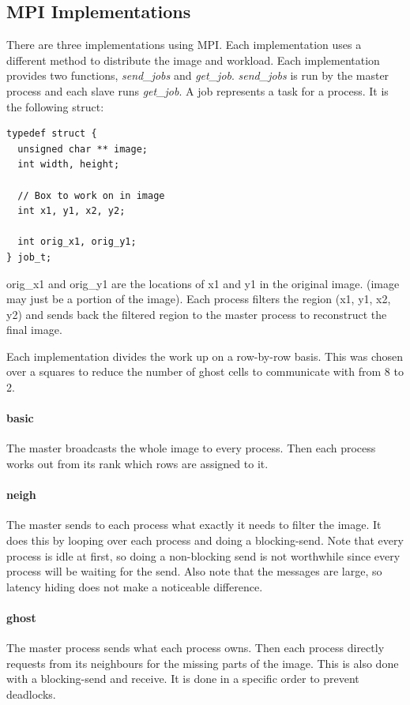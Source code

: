 \documentclass{article}
\begin{document}
\subsection{MPI Implementations}

There are three implementations using MPI. Each implementation uses a
different method to distribute the image and workload. Each implementation
provides two functions, \emph{send\_jobs} and
\emph{get\_job}. \emph{send\_jobs} is run by the master process and each slave
runs \emph{get\_job}. A job represents a task for a process. It is the
following struct:
\begin{verbatim}
typedef struct {
  unsigned char ** image;
  int width, height;

  // Box to work on in image
  int x1, y1, x2, y2;

  int orig_x1, orig_y1;
} job_t;
\end{verbatim}
orig\_x1 and orig\_y1 are the locations of x1 and y1 in the original
image. (image may just be a portion of the image). Each process filters the
region (x1, y1, x2, y2) and sends back the filtered region to the master
process to reconstruct the final image.

Each implementation divides the work up on a row-by-row basis. This was chosen
over a squares to reduce the number of ghost cells to communicate with from 8
to 2.

\paragraph{basic} The master broadcasts the whole image to every
process. Then each process works out from its rank which rows are assigned to
it.

\paragraph{neigh} The master sends to each process what exactly it needs to
filter the image. It does this by looping over each process and doing a
blocking-send. Note that every process is idle at first, so doing a
non-blocking send is not worthwhile since every process will be waiting for
the send. Also note that the messages are large, so latency hiding does not
make a noticeable difference.

\paragraph{ghost} The master process sends what each process owns. Then each
process directly requests from its neighbours for the missing parts of the
image. This is also done with a blocking-send and receive. It is done in a
specific order to prevent deadlocks.
\end{document}
